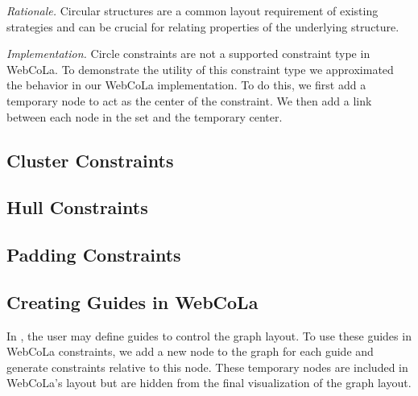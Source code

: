 
\emph{Rationale.} Circular structures are a common layout requirement of
existing strategies  and can be crucial for relating
properties of the underlying structure.

\emph{Implementation.}
Circle constraints are not a supported constraint type in WebCoLa. To 
demonstrate the utility of this constraint type we approximated the behavior
in our WebCoLa implementation. To do this, we first add a temporary node
to act as the center of the constraint. We then add a link between each 
node in the set and the temporary center. 


\subsection{Cluster Constraints}

\subsection{Hull Constraints}

\subsection{Padding Constraints}

\subsection{Creating Guides in WebCoLa}
In \projectname, the user may define guides to control the graph layout.
To use these guides in WebCoLa constraints, we add a new node to the graph
for each guide and generate constraints relative to this node. These 
temporary nodes are included in WebCoLa's layout but are hidden from the
final visualization of the graph layout.
